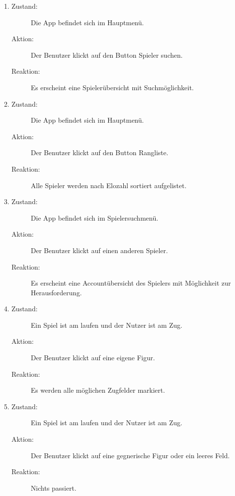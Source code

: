 \documentclass[parskip=full]{scrartcl}
\begin{document}
\begin{enumerate}
	\item
	\begin{description}
	\item[Zustand:] Die App befindet sich im Hauptmenü.
	\item[Aktion:] Der Benutzer klickt auf den Button \glqq Spieler suchen\grqq.
	\item[Reaktion:] Es erscheint eine Spielerübersicht mit Suchmöglichkeit.  \\
	\end{description}
	
	\item
	\begin{description}
	\item[Zustand:] Die App befindet sich im Hauptmenü.
	\item[Aktion:] Der Benutzer klickt auf den Button \glqq Rangliste\grqq.
	\item[Reaktion:] Alle Spieler werden nach \gls{Elo}zahl sortiert aufgelistet.  \\
	\end{description}
	
	\item
	\begin{description}
	\item[Zustand:] Die App befindet sich im Spielersuchmenü.
	\item[Aktion:] Der Benutzer klickt auf einen anderen Spieler.
	\item[Reaktion:] Es erscheint eine Accountübersicht des Spielers mit Möglichkeit zur Herausforderung.  \\
	\end{description}
	
	\item 
	\begin{description}
	\item[Zustand:] Ein Spiel ist am laufen und der Nutzer ist am Zug.
	\item[Aktion:] Der Benutzer klickt auf eine eigene Figur.
	\item[Reaktion:] Es werden alle möglichen Zugfelder markiert.  \\
	\end{description}
	
	\item 
	\begin{description}
	\item[Zustand:] Ein Spiel ist am laufen und der Nutzer ist am Zug.
	\item[Aktion:] Der Benutzer klickt auf eine gegnerische Figur oder ein leeres Feld.
	\item[Reaktion:] Nichts passiert.  \\
	\end{description}
	

\end{enumerate}
\end{document}
